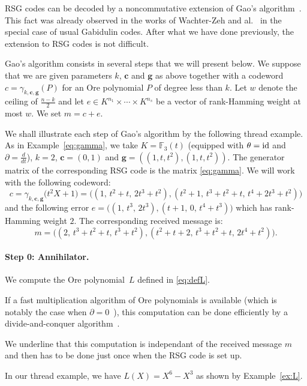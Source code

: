 \documentclass[a4paper]{llncs}
\newcommand{\FF}{\mathbb F}
\newcommand{\id}{\textrm{\rm id}}
\newcommand{\bc}{\textbf{c}}
\newcommand{\bg}{\textbf{g}}
\begin{document}
RSG codes can be decoded by a noncommutative extension of Gao's 
algorithm~\cite{gao}. This fact was already observed in the works of 
Wachter-Zeh and al.~\cite{wachter} in the special case of usual Gabidulin
codes. After what we have done previously, the extension to RSG codes 
is not difficult.

Gao's algorithm consists in several steps that we will 
present below. We suppose that we are given parameters $k$, $\bc$ and
$\bg$ as above together with a codeword $c = \gamma_{k,\bc,\bg}(P)$
for an Ore polynomial $P$ of degree less than $k$. 
Let $w$ denote the ceiling of $\frac{n-k}2$ and 
let $e \in K^{n_1} \times \cdots \times K^{n_s}$ be 
a vector of rank-Hamming weight at most $w$. We set $m = c + e$.

{\small
\begin{example}
We shall illustrate each step of Gao's algorithm by the following 
thread example. As
in Example~\ref{eq:gamma}, we take $K = \FF_3(t)$ (equipped with 
$\theta = \id$ and $\partial = \frac d{dt}$), $k = 2$, $\bc = (0,1)$
and $\bg = ((1,t,t^2),(1,t,t^2))$. The generator matrix of
the corresponding RSG code is the matrix \eqref{eq:gamma}.
We will work with the following codeword:
$$c = \gamma_{k,\bc,\bg}\big(t^2 X + 1\big)
    = \big((1,\,t^2{+}t,\,2t^3{+}t^2), (t^2{+}1,\,t^3{+}t^2{+}t,\,t^4{+}2t^3{+}t^2)\big)$$
and the following error $e = \big((1,\,t^3,\,2t^3), (t{+}1,\,0,\,t^4{+}t^3)\big)$
which has rank-Hamming weight $2$. The corresponding received message is:
$$m = \big(
(2,\,t^3{+}t^2{+}t,\,t^3{+}t^2), (t^2{+}t{+}2,\,t^3{+}t^2{+}t,\,2t^4{+}t^2)\big).$$
\end{example}}

\paragraph{Step 0: Annihilator.}

We compute the Ore polynomial~$L$ defined in \eqref{eq:defL}.

\noindent
If a fast multiplication algorithm of Ore polynomials is available
(which is notably the case when $\partial = 0$~\cite{pushwach,carleb}), 
this computation can be done efficiently by a divide-and-conquer
algorithm~\cite{carleb}.

We underline that this computation is independant of the received
message $m$ and then has to be done just once when the RSG code is 
set up.

{\small
\begin{example}
In our thread example, we have $L(X) = X^6 - X^3$ as shown by
Example~\ref{ex:L}.
\end{example}}
\end{document}
